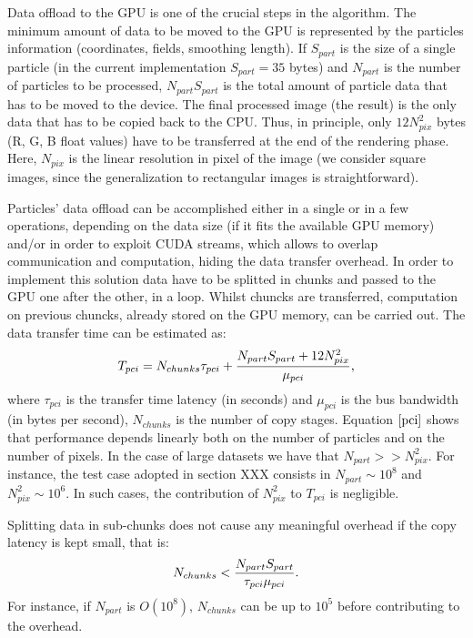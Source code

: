 \documentclass[11pt]{article}
\begin{document}
Data offload to the GPU is one of the crucial steps in the algorithm. 
The minimum amount of data 
to be moved to the GPU is represented by the particles information 
(coordinates, fields, smoothing length). If $S_{part}$ is the
size of a single particle (in the current implementation $S_{part}=35$ bytes) and 
$N_{part}$ is the number of particles to be processed,
$N_{part} S_{part}$ is the total amount of particle data that has to be moved to the device.
The final processed image (the result) is the only data that has to be copied back to
the CPU. Thus, in principle, only $12 N_{pix}^2$ bytes (R, G, B float values) have to be transferred at
the end of the rendering phase. Here, $N_{pix}$ is the linear resolution in pixel of the 
image (we consider square images, since the generalization to rectangular images is
straightforward). 

Particles' data offload can be accomplished either in a single or in a few operations, 
depending on the data size (if it fits the available GPU memory) and/or
in order to exploit CUDA streams, which allows to overlap communication 
and computation, hiding the data transfer overhead.  
In order to implement this solution data have to be
splitted in chunks and passed to the GPU one after the other, in a loop. Whilst chuncks 
are transferred, computation on previous chuncks, already stored on the GPU
memory, can be carried out. 
The data transfer time can be estimated as:
\begin{equation}\label{pci}
T_{pci} =  N_{chunks} \tau_{pci} + {N_{part} S_{part} + 12 N_{pix}^2 \over 
\mu_{pci}},
\end{equation}
where $\tau_{pci}$ is the transfer time latency (in seconds) and $\mu_{pci}$ is the
bus bandwidth (in bytes per second), $N_{chunks}$ is the number 
of copy stages. 
Equation $\eqref{pci}$ shows that performance
depends linearly both on the number of particles and on the number of pixels.
In the case of large datasets we have that
$N_{part} >> N_{pix}^2$. For instance, the test case adopted
in section XXX consists in $N_{part} \sim 10^8$
and $N_{pix}^2 \sim 10^6$. In such cases, the contribution of $N_{pix}^2$
to $T_{pci}$ is negligible.

Splitting data in sub-chunks does not
cause any meaningful overhead if the copy latency is kept small, that is:
\begin{equation}
N_{chunks} < {N_{part} S_{part}\over \tau_{pci}\mu_{pci}}.
\end{equation}
For instance, if $N_{part}$ is $O(10^8)$, $N_{chunks}$ can be up to $10^5$ before
contributing to the overhead.
\end{document}
